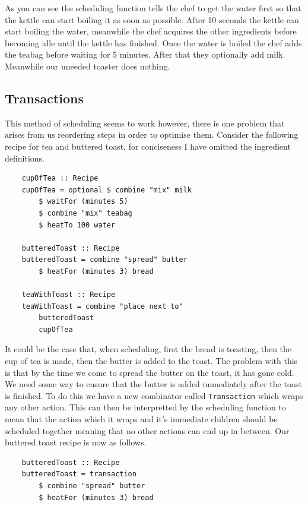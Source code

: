 \documentclass[11pt]{article}
\begin{document}
As you can see the scheduling function tells the chef to get the water first so that the
kettle can start boiling it as soon as possible. After 10 seconds the kettle can start
boiling the water, meanwhile the chef acquires the other ingredients before becoming idle
until the kettle has finished. Once the water is boiled the chef adds the teabag before
waiting for 5 minutes. After that they optionally add milk. Meanwhile our uneeded toaster
does nothing.

\subsection{Transactions}

This method of scheduling seems to work however, there is one problem that arises from us
reordering steps in order to optimise them. Consider the following recipe for tea and buttered toast,
for conciseness I have omitted the ingredient definitions.

\begin{lstlisting}
    cupOfTea :: Recipe
    cupOfTea = optional $ combine "mix" milk
        $ waitFor (minutes 5)
        $ combine "mix" teabag
        $ heatTo 100 water

    butteredToast :: Recipe
    butteredToast = combine "spread" butter
        $ heatFor (minutes 3) bread

    teaWithToast :: Recipe
    teaWithToast = combine "place next to"
        butteredToast
        cupOfTea
\end{lstlisting}

It could be the case that, when scheduling, first the bread is toasting, then the cup of tea is
made, then the butter is added to the toast. The problem with this is that by the time we come
to spread the butter on the toast, it has gone cold. We need some way to ensure that the butter
is added immediately after the toast is finished. To do this we have a new combinator called
\texttt{Transaction} which wraps any other action. This can then be interpretted by the scheduling
function to mean that the action which it wraps and it's immediate children should be scheduled
together meaning that no other actions can end up in between. Our buttered toast recipe is now
as follows.

\begin{lstlisting}
    butteredToast :: Recipe
    butteredToast = transaction
        $ combine "spread" butter
        $ heatFor (minutes 3) bread
\end{lstlisting}
\end{document}
